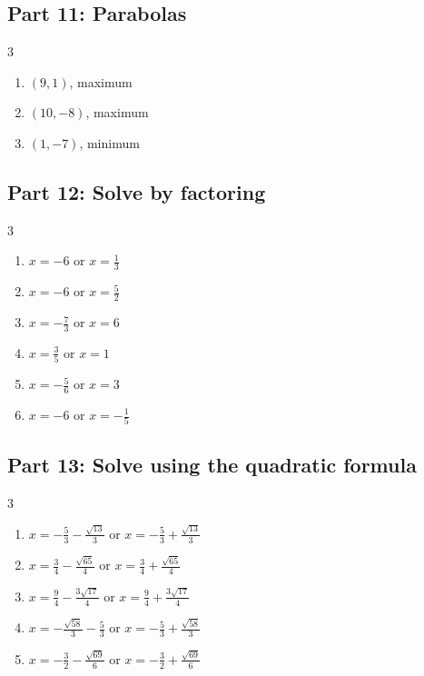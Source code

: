 \documentclass[11pt]{article}
\begin{document}
\subsection*{Part 11: Parabolas}
\begin{multicols}{3}
\begin{enumerate}
  \item $(9, 1)$, maximum
  \item $(10, -8)$, maximum
  \item $(1, -7)$, minimum
\end{enumerate}
\end{multicols}
\subsection*{Part 12: Solve by factoring}
\begin{multicols}{3}
\begin{enumerate}
  \item $x = -6 \text{ or } x = \frac{1}{3}$
  \item $x = -6 \text{ or } x = \frac{5}{2}$
  \item $x = - \frac{7}{3} \text{ or } x = 6$
  \item $x = \frac{3}{5} \text{ or } x = 1$
  \item $x = - \frac{5}{6} \text{ or } x = 3$
  \item $x = -6 \text{ or } x = - \frac{1}{5}$
\end{enumerate}
\end{multicols}
\subsection*{Part 13: Solve using the quadratic formula}
\begin{multicols}{3}
\begin{enumerate}
  \item $x = - \frac{5}{3} - \frac{\sqrt{13}}{3} \text{ or } x = - \frac{5}{3} + \frac{\sqrt{13}}{3}$
  \item $x = \frac{3}{4} - \frac{\sqrt{65}}{4} \text{ or } x = \frac{3}{4} + \frac{\sqrt{65}}{4}$
  \item $x = \frac{9}{4} - \frac{3 \sqrt{17}}{4} \text{ or } x = \frac{9}{4} + \frac{3 \sqrt{17}}{4}$
  \item $x = - \frac{\sqrt{58}}{3} - \frac{5}{3} \text{ or } x = - \frac{5}{3} + \frac{\sqrt{58}}{3}$
  \item $x = - \frac{3}{2} - \frac{\sqrt{69}}{6} \text{ or } x = - \frac{3}{2} + \frac{\sqrt{69}}{6}$
\end{enumerate}
\end{multicols}
\end{document}
